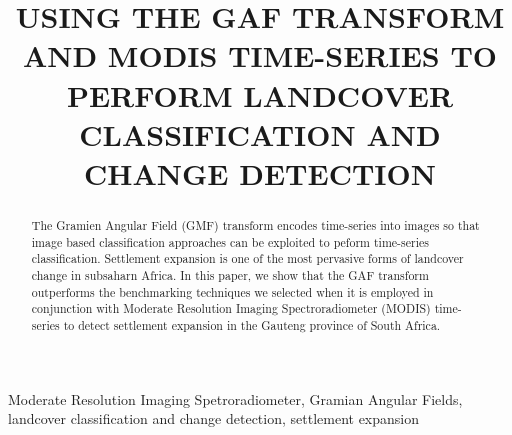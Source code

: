 \documentclass{article}
\title{USING THE GAF TRANSFORM AND MODIS TIME-SERIES TO PERFORM LANDCOVER CLASSIFICATION AND CHANGE DETECTION}
\begin{document}
%
\maketitle
%
\begin{abstract}
The Gramien Angular Field (GMF) transform encodes time-series into images so that image based classification approaches can be exploited to peform time-series classification. Settlement expansion is one of the most pervasive forms of landcover change in subsaharn Africa. In this paper, we show that the GAF transform outperforms the benchmarking techniques we selected when it is employed in conjunction with Moderate Resolution Imaging Spectroradiometer (MODIS) time-series to detect settlement expansion in the Gauteng province of South Africa.   
\end{abstract}
%
\begin{keywords}
Moderate Resolution Imaging Spetroradiometer, Gramian Angular Fields, landcover classification and change detection, settlement expansion
\end{keywords}
%
\end{document}
